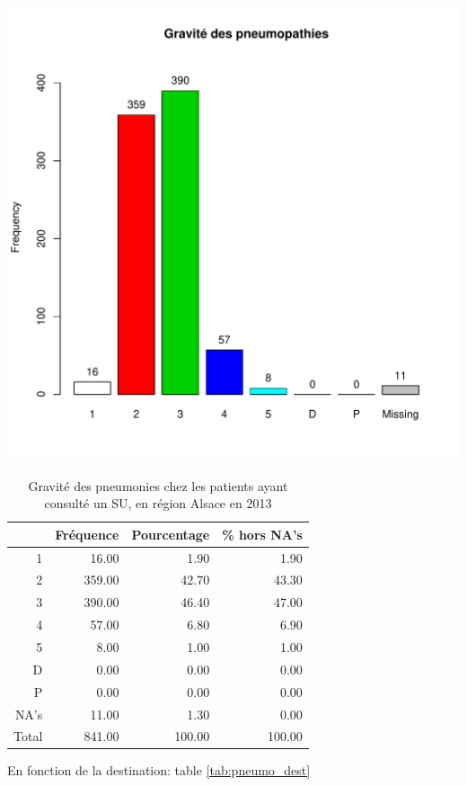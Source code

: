 \documentclass[12pt,english,french,twoside]{book}\usepackage[]{graphicx}\usepackage[]{color}
\makeatletter
\def\maxwidth{ %
  \ifdim\Gin@nat@width>\linewidth
    \linewidth
  \else
    \Gin@nat@width
  \fi
}
\makeatother
\begin{document}
\includegraphics[width=\maxwidth]{figure/unnamed-chunk-40-1} 
\begin{table}[ht]
\centering
\begin{tabular}{rrrr}
  \hline
 & Fréquence & Pourcentage & \% hors NA's \\ 
  \hline
1 & 16.00 & 1.90 & 1.90 \\ 
  2 & 359.00 & 42.70 & 43.30 \\ 
  3 & 390.00 & 46.40 & 47.00 \\ 
  4 & 57.00 & 6.80 & 6.90 \\ 
  5 & 8.00 & 1.00 & 1.00 \\ 
  D & 0.00 & 0.00 & 0.00 \\ 
  P & 0.00 & 0.00 & 0.00 \\ 
  NA's & 11.00 & 1.30 & 0.00 \\ 
    Total & 841.00 & 100.00 & 100.00 \\ 
   \hline
\end{tabular}
\caption[Gravité des pneumonies]{Gravité des pneumonies chez les patients ayant consulté un  SU, en région Alsace en 2013} 
\label{tab:pneumonies}
\end{table}


En fonction de la destination: table \ref{tab:pneumo_dest}
\end{document}
